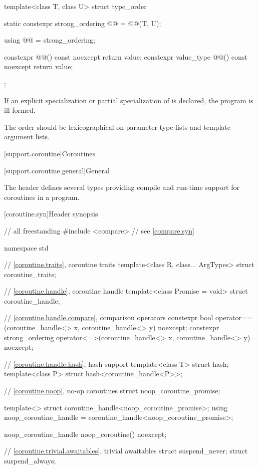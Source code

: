 %
\begin{itemdecl}
template<class T, class U> struct type_order {
  static constexpr strong_ordering @@ = @@(T, U);

  using @@ = strong_ordering;

  constexpr @@() const noexcept { return value; }
  constexpr value_type @@() const noexcept { return value; }
};
\end{itemdecl}

\begin{itemdescr}
\pnum
If an explicit specialization or partial specialization of  is declared,
the program is ill-formed.

\pnum
\recommended
The order should be lexicographical on parameter-type-lists and template argument lists.
\end{itemdescr}

[support.coroutine]{Coroutines}

[support.coroutine.general]{General}

\pnum
The header 
defines several types providing
compile and run-time support for
coroutines in a \Cpp{} program.

[coroutine.syn]{Header  synopsis}

%
%
\begin{codeblock}
// all freestanding
#include <compare>              // see \ref{compare.syn}

namespace std {
  // \ref{coroutine.traits}, coroutine traits
  template<class R, class... ArgTypes>
    struct coroutine_traits;

  // \ref{coroutine.handle}, coroutine handle
  template<class Promise = void>
    struct coroutine_handle;

  // \ref{coroutine.handle.compare}, comparison operators
  constexpr bool operator==(coroutine_handle<> x, coroutine_handle<> y) noexcept;
  constexpr strong_ordering operator<=>(coroutine_handle<> x, coroutine_handle<> y) noexcept;

  // \ref{coroutine.handle.hash}, hash support
  template<class T> struct hash;
  template<class P> struct hash<coroutine_handle<P>>;

  // \ref{coroutine.noop}, no-op coroutines
  struct noop_coroutine_promise;

  template<> struct coroutine_handle<noop_coroutine_promise>;
  using noop_coroutine_handle = coroutine_handle<noop_coroutine_promise>;

  noop_coroutine_handle noop_coroutine() noexcept;

  // \ref{coroutine.trivial.awaitables}, trivial awaitables
  struct suspend_never;
  struct suspend_always;
}
\end{codeblock}

